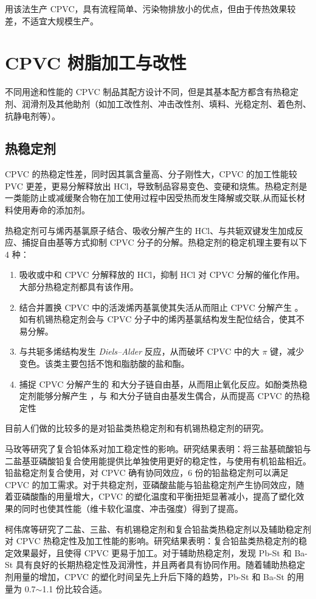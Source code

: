 用该法生产 CPVC，具有流程简单、污染物排放小的优点，但由于传热效果较差，不适宜大规模生产。


\section{CPVC 树脂加工与改性}
不同用途和性能的 CPVC 制品其配方设计不同，但是其基本配方都含有热稳定剂、润滑剂及其他助剂（如加工改性剂、冲击改性剂、填料、光稳定剂、着色剂、抗静电剂等）。

\subsection{热稳定剂}
CPVC 的热稳定性差，同时因其氯含量高、分子刚性大，CPVC 的加工性能较 PVC 更差，更易分解释放出 HCl，导致制品容易变色、变硬和烧焦。热稳定剂是一类能防止或减缓聚合物在加工使用过程中因受热而发生降解或交联,从而延长材料使用寿命的添加剂\cite{27}。\par
热稳定剂可与烯丙基氯原子结合、吸收分解产生的 HCl、与共轭双键发生加成反应、捕捉自由基等方式抑制 CPVC 分子的分解。热稳定剂的稳定机理主要有以下 4 种：

\begin{enumerate}[(1) ]
    \item 吸收或中和 CPVC 分解释放的 HCl，抑制 HCl 对 CPVC 分解的催化作用。大部分热稳定剂都具有该作用。
    \item 结合并置换 CPVC 中的活泼烯丙基氯使其失活从而阻止 CPVC 分解产生 \;。如有机锡热稳定剂会与 CPVC 分子中的烯丙基氯结构发生配位结合，使其不易分解。
    \item 与共轭多烯结构发生 \textit{Diels–Alder} 反应，从而破坏 CPVC 中的大 $\pi$ 键，减少变色。该类主要包括不饱和脂肪酸的盐和酯。
    \item 捕捉 CPVC 分解产生的 \; 和大分子链自由基，从而阻止氧化反应。如酚类热稳定剂能够分解产生 \;，与 \; 和大分子链自由基发生偶合，从而提高 CPVC 的热稳定性
\end{enumerate}

目前人们做的比较多的是对铅盐类热稳定剂和有机锡热稳定剂的研究。\par
马玫等\cite{6}研究了复合铅体系对加工稳定性的影响。研究结果表明：将三盐基硫酸铅与二盐基亚磷酸铅复合使用能提供比单独使用更好的稳定性，与使用有机铅盐相近。铅盐稳定剂复合使用，对 CPVC 确有协同效应，6 份的铅盐稳定剂可以满足 CPVC 的加工需求。对于共稳定剂，亚磷酸盐能与铅盐稳定剂产生协同效应，随着亚磷酸酯的用量增大，CPVC 的塑化温度和平衡扭矩显著减小，提高了塑化效果的同时也使其性能（维卡软化温度、冲击强度）得到了提高。\par
柯伟席等\cite{8}研究了二盐、三盐、有机锡稳定剂和复合铅盐类热稳定剂以及辅助稳定剂对 CPVC 热稳定性及加工性能的影响。研究结果表明：复合铅盐类热稳定剂的稳定效果最好，且使得 CPVC 更易于加工。对于辅助热稳定剂，发现 Pb-St 和 Ba-St 具有良好的长期热稳定性及润滑性，并且两者具有协同作用。随着辅助热稳定剂用量的增加，CPVC 的塑化时间呈先上升后下降的趋势，Pb-St 和 Ba-St 的用量为 0.7$\sim$1.1 份比较合适。

